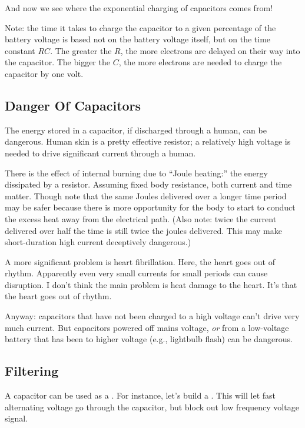 \documentclass[11pt, oneside]{amsart}
\begin{document}
\noindent
And now we see where the exponential charging of capacitors comes
from!

Note: the time it takes to charge the capacitor to a given percentage of
the battery voltage is based not on the battery voltage itself, but on
the time constant $RC$. The greater the $R$, the more electrons are
delayed on their way into the capacitor. The bigger the $C$, the more
electrons are needed to charge the capacitor by one volt.

\subsection{Danger Of Capacitors}

The energy stored in a capacitor, if discharged through a human, can be
dangerous. Human skin is a pretty effective resistor; a relatively high
voltage is needed to drive significant current through a human.

There is the effect of internal burning due to ``Joule heating:'' the
energy dissipated by a resistor. Assuming fixed body resistance, both
current and time matter. Though note that the same Joules delivered over
a longer time period may be safer because there is more opportunity for
the body to start to conduct the excess heat away from the electrical
path. (Also note: twice the current delivered over half the time is
still twice the joules delivered. This may make short-duration high
current deceptively dangerous.)

A more significant problem is heart fibrillation. Here, the heart goes
out of rhythm. Apparently even very small currents for small periods can
cause disruption. I don't think the main problem is heat damage to the
heart. It's that the heart goes out of rhythm.

Anyway: capacitors that have not been charged to a high voltage can't
drive very much current. But capacitors powered off mains voltage,
\emph{or} from a low-voltage battery that has been 
to higher voltage (e.g., lightbulb flash) can be dangerous.

\subsection{Filtering}

A capacitor can be used as a . For instance, let's build
a . This will let fast alternating voltage go
through the capacitor, but block out low frequency voltage signal.
\end{document}
